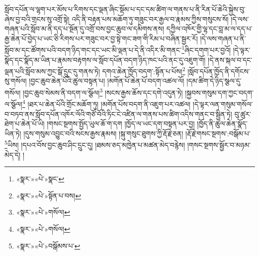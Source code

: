 སློབ་དཔོན་ལ་ལྷག་པར་མོས་པ་རིགས་དང་ལྡན་ཞིང་སྡོམ་པ་དང་དམ་ཚིག་ལ་གནས་པ་ནི་རིན་པོ་ཆེའི་སྐྱེས་བུ་ཞེས་བྱ་བའི་གྲངས་སུ་འགྲོ་སྟེ། འདི་ནི་བརྟན་པས་མཆོག་ཏུ་གཟུང་བར་རྒྱལ་བ་རྣམས་ཀྱིས་གསུངས་སོ། །དེ་ལས་གཞན་པའི་སློབ་མ་ནི་དད་པ་སྔོན་དུ་འགྲོ་བས་བྱང་ཆུབ་ལ་དམིགས་ནས། དཀྱིལ་འཁོར་གྱི་ལྷ་དང་བླ་མ་ལ་དད་པ་རྒྱ་ཆེན་པོ་བྱེད་པ་ཡང་ཅི་རིགས་པར་གཟུང་བར་བྱ་སྟེ་གང་ཟག་གི་རིམ་པ་བཞིན་སྦྱར་རོ། །དེ་ལས་གཞན་པ་ནི་སློབ་མ་དང་ཚོགས་པའི་བདག་ཉིད་གང་དང་ཡང་མི་ལྡན་པ་དེ་ནི་འདིར་མི་གནང་\footnote{«སྣར་»«པེ་»སྣང་}ཞིང་དགག་པར་བྱའོ། །དེ་ལྟར་སྣོད་དང་སྣོད་མ་ཡིན་པ་རྣམས་བརྟགས་ལ་སློབ་དཔོན་བདག་ཉིད་ཁང་པའི་ནང་དུ་འཇུག་གོ། །དེ་ནས་སྐལ་བ་དང་ལྡན་པའི་སློབ་མས་ཀྱང་སྒོ་དྲུང་དུ་གནས་ཏེ། དགའ་ཆེན་ཁྱོད་བདག་:སྟོན་པ་པོས།\footnote{«སྣར་»«པེ་»སྟོན་པ་བས།} །སློབ་དཔོན་ཁྱོད་ནི་དགོངས་སུ་གསོལ། །བྱང་ཆུབ་ཆེན་པོའི་ཚུལ་བསྟན་པ། །མགོན་པོ་ཆེན་པོ་བདག་འཚལ་ལོ། །དམ་ཚིག་དེ་ཉིད་སྩལ་དུ་གསོལ། །བྱང་ཆུབ་སེམས་ནི་བདག་ལ་སྩོལ།\footnote{«སྣར་»«པེ་»གསོལ།} །སངས་རྒྱས་ཆོས་དང་དགེ་འདུན་ཏེ། །སྐྱབས་གསུམ་དག་ཀྱང་བདག་ལ་སྩོལ།\footnote{«སྣར་»«པེ་»གསོལ།} །ཐར་པ་ཆེན་པོའི་གྲོང་མཆོག་ཏུ། །མགོན་པོས་བདག་ནི་འཇུག་པར་འཚལ། །དེ་ལྟར་ལན་གསུམ་གསོལ་བ་བཏབ་ནས་སློབ་དཔོན་འཁོར་ལོའི་གཙོ་བོའི་ཏིང་ངེ་འཛིན་ལ་གནས་པས་ཚིག་འདིས་གནང་བ་སྦྱིན་ཏེ། བུ་ཚུར་ཐེག་པ་ཆེན་པོ་ཡི། །གསང་སྔགས་སྤྱོད་ཡུལ་ཆོ་ག་དག །ཁྱོད་ལ་ཡང་དག་བསྟན་པར་བྱ། །ཁྱོད་ནི་ཚུལ་ཆེན་སྣོད་ཡིན་ཏེ། །དུས་གསུམ་འབྱུང་བའི་སངས་རྒྱས་རྣམས། །སྐུ་གསུང་ཐུགས་ཀྱི་རྡོ་རྗེ་ཅན། །རྡོ་རྗེ་གསང་སྔགས་:བསྒོམ་པ་\footnote{«སྣར་»«པེ་»བསྒོམས་པ་}ཡིས། །དཔའ་བོས་བྱང་ཆུབ་ཤིང་དྲུང་དུ། །ཐམས་ཅད་མཁྱེན་པ་མཚན་མེད་བརྙེས། །གསང་སྔགས་སྦྱོར་བ་མཉམ་མེད་དེ། །
